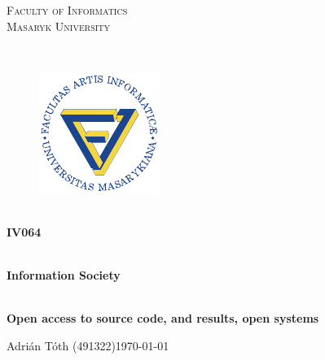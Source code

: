 \documentclass[12pt,a4paper]{article}
\theoremstyle{definition}
\begin{document}
\begin{titlepage}

    \begin{center}
        \vfill {%
            \Huge{%
                \textsc{%
                    Faculty of Informatics\\[3mm]%
                    Masaryk University%
                }%
            }%
        }%

        \hfill\\[15mm]

        \begin{figure}[!h]
            \centering
            \includegraphics[scale=3]{img/muni-fi-logo.pdf}
        \end{figure}

        \hfill\\[10mm]

        \Huge{
            \textbf{
                IV064
            }
        }

        \hfill\\[-10mm]

        \huge{
            \textbf{
                Information Society
            }
        }

        \hfill\\[10mm]

        \LARGE{
            \textbf{
                Open access to source code, and results, open systems
            }
        }
        \vfill

    \end{center}

        \Large{
            \noindent Adrián Tóth (491322)\hfill \today
        }

\end{titlepage}

\setlength{\parskip}{0pt}
    {
        \hypersetup{
            hidelinks=true
        }
        \tableofcontents
    }
\setlength{\parskip}{0pt}

\newpage
\end{document}
